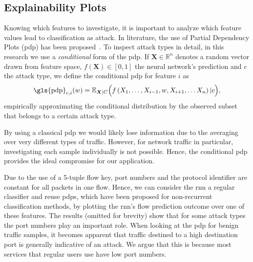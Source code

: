 \documentclass[conference]{IEEEtran}
\begin{document}
\subsection{Explainability Plots}
Knowing which features to investigate, it is important to analyze which feature values lead to classification as attack.
In literature, the use of Partial Dependency Plots (\gls{pdp}) has been proposed~\cite{friedman_greedy_2001}. To inspect attack types in detail, in this research we use a \textit{conditional} form of the \gls{pdp}. If $\boldsymbol X \in \mathbb R ^n$ denotes a random vector drawn from feature space, $f(\boldsymbol X) \in [0,1]$ the neural network's prediction and $c$ the attack type, we define the conditional \gls{pdp} for feature $i$  as
\begin{equation} \label{eq:pdp_conditional}
\text{\gls{pdp}}_{c,i}(w) = \mathbb E_{\boldsymbol X | C} \Big(f \left( X_1,\ldots,X_{i-1},w,X_{i+1},\ldots X_n \right) | c\Big),
\end{equation}
empirically approximating the conditional distribution by the observed subset that belongs to a certain attack type.

By using a classical \gls{pdp} we would likely lose information due to the averaging over very different types of traffic. However, for network traffic in particular, investigating each sample individually is not possible. Hence, the conditional \gls{pdp} provides the ideal compromise for our application.

Due to the use of a 5-tuple flow key, port numbers and the protocol identifier are constant for all packets in one flow.
Hence, we can consider the \gls{rnn} a regular classifier and reuse 
\glspl{pdp}, which have been proposed for non-recurrent classification methods, by plotting the \gls{rnn}'s flow prediction outcome over one of these  features.
The results (omitted for brevity) show that for some attack types the port numbers play an important role. When looking at the \gls{pdp} for benign traffic samples, %
it becomes apparent that traffic destined to a high destination port is generally indicative of an attack. We argue that this is because most services that regular users use have low port numbers.
\end{document}
